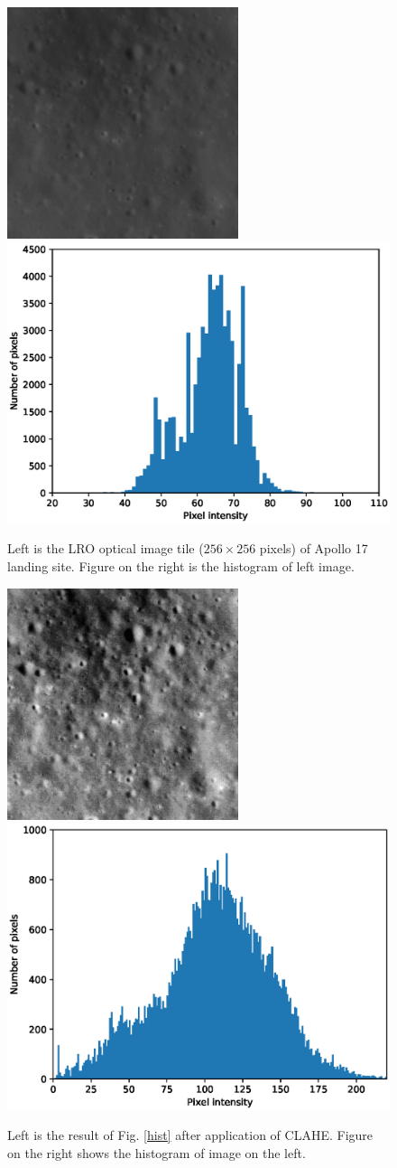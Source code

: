 \documentclass[11pt]{article}
\begin{document}
\begin{figure}[ht!]
	\includegraphics[width=.4\textwidth]{files/unet/IMG-0.png}
	\includegraphics[width=.6\textwidth]{files/unet/0_hist.eps}
	\caption{Left is the LRO optical image tile ($256 \times 256$ pixels) of Apollo 17 landing site. Figure on the right is the histogram of left image.}
	\label{hist}
	\includegraphics[width=.4\textwidth]{files/unet/0_clahe.png}
	\includegraphics[width=.6\textwidth]{files/unet/0_hist_clahe.eps}
	\caption{Left is the result of Fig. \ref{hist} after application of CLAHE. Figure on the right shows the histogram of image on the left.}
	\label{clahe}
\end{figure}
\end{document}
